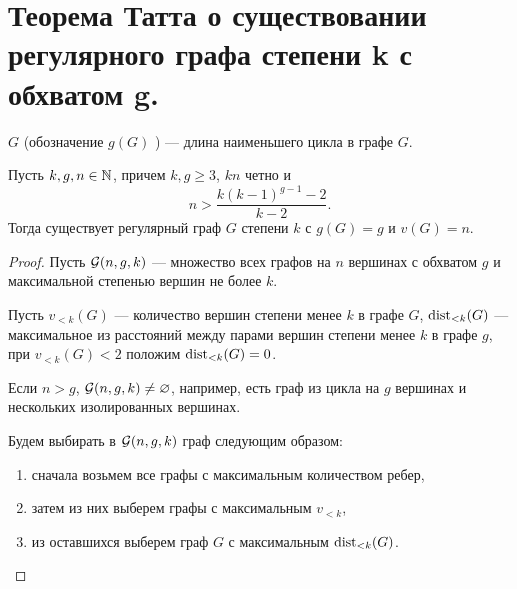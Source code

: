 \section{Теорема Татта о существовании регулярного графа степени k с обхватом g.}
\begin{definition}
	 $G$ (обозначение  $g(G)$ ) --- длина наименьшего цикла в графе $G$.
\end{definition}
\begin{theorem}[Тaтт]
	Пусть $k, g, n \in \mathbb{N}$, причем $k, g \ge 3$, $kn$ четно и 
	 \[
	n > \frac{k(k-1)^{g-1} -2}{k-2}
	.\] 
	Тогда существует регулярный граф $G$ степени $k$ с $g(G) = g$ и $v(G) = n$.
\end{theorem}
\begin{proof}
		Пусть $\mathcal{G}(n, g, k)$ --- множество всех графов на $n$ вершинах с обхватом $g$ и максимальной степенью вершин не более $k$.

		Пусть $v_{<k}(G)$ --- количество вершин степени менее $k$ в графе $G$, $\operatorname{dist}_{<k}(G)$ --- максимальное из расстояний между парами вершин степени менее $k$ в графе $g$, при $v_{<k}(G) < 2$ положим $\operatorname{dist}_{<k}(G) = 0$.

		Если $n > g$, $\mathcal{G}(n, g, k) \neq \varnothing$, например, есть граф из цикла на $g$ вершинах и нескольких изолированных вершинах.

		Будем выбирать в $\mathcal{G}(n, g, k)$ граф следующим образом:
			\begin{enumerate}
				\item сначала возьмем все графы с максимальным количеством ребер,
				\item затем из них выберем графы с максимальным $v_{<k}$,
				\item из оставшихся выберем граф $G$ с максимальным $\operatorname{dist}_{<k}(G)$.
			\end{enumerate}


\end{proof}
